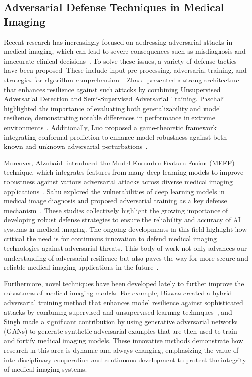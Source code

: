 \documentclass[preprint,12pt]{elsarticle}
\begin{document}
\subsection{Adversarial Defense Techniques in Medical Imaging}
Recent research has increasingly focused on addressing adversarial attacks in medical imaging, which can lead to severe consequences such as misdiagnosis and inaccurate clinical decisions~\cite{Dhamija24}. To solve these issues, a variety of defense tactics have been proposed. These include input pre-processing, adversarial training, and strategies for algorithm comprehension~\cite{Pal24}. Zhao~\cite{Zhao22} presented a strong architecture that enhances resilience against such attacks by combining Unsupervised Adversarial Detection and Semi-Supervised Adversarial Training. Paschali highlighted the importance of evaluating both generalizability and model resilience, demonstrating notable differences in performance in extreme environments~\cite{Priya23}. Additionally, Luo proposed a game-theoretic framework integrating conformal prediction to enhance model robustness against both known and unknown adversarial perturbations~\cite{Luo24}.

Moreover, Alzubaidi introduced the Model Ensemble Feature Fusion (MEFF) technique, which integrates features from many deep learning models to improve robustness against various adversarial attacks across diverse medical imaging applications~\cite{Alzubaidi24}. Sahu explored the vulnerabilities of deep learning models in medical image diagnosis and proposed adversarial training as a key defense mechanism~\cite{Sahu24}. These studies collectively highlight the growing importance of developing robust defense strategies to ensure the reliability and accuracy of AI systems in medical imaging. The ongoing developments in this field highlight how critical the need is for continuous innovation to defend medical imaging technologies against adversarial threats. This body of work not only advances our understanding of adversarial resilience but also paves the way for more secure and reliable medical imaging applications in the future~\cite{Ou24}.

Furthermore, novel techniques have been developed lately to further improve the robustness of medical imaging models. For example, Biswas created a hybrid adversarial training method that enhances model resilience against sophisticated attacks by combining supervised and unsupervised learning techniques~\cite{Biswas24}, and Singh made a significant contribution by using generative adversarial networks (GANs) to generate synthetic adversarial examples that are then used to train and fortify medical imaging models. These innovative methods demonstrate how research in this area is dynamic and always changing, emphasizing the value of interdisciplinary cooperation and continuous development to protect the integrity of medical imaging systems.
\end{document}
